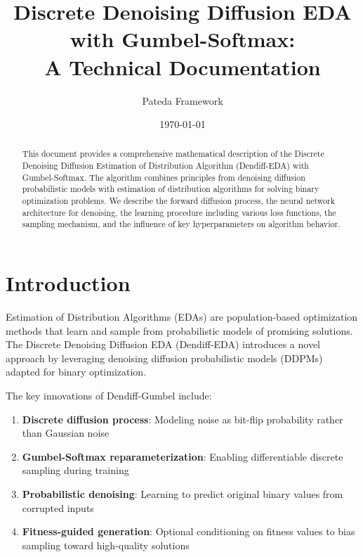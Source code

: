 \documentclass[11pt,a4paper]{article}
\title{Discrete Denoising Diffusion EDA with Gumbel-Softmax:\\
A Technical Documentation}
\author{Pateda Framework}
\date{\today}
\begin{document}
\maketitle

\begin{abstract}
This document provides a comprehensive mathematical description of the Discrete Denoising Diffusion Estimation of Distribution Algorithm (Dendiff-EDA) with Gumbel-Softmax. The algorithm combines principles from denoising diffusion probabilistic models with estimation of distribution algorithms for solving binary optimization problems. We describe the forward diffusion process, the neural network architecture for denoising, the learning procedure including various loss functions, the sampling mechanism, and the influence of key hyperparameters on algorithm behavior.
\end{abstract}

\tableofcontents
\newpage

\section{Introduction}

Estimation of Distribution Algorithms (EDAs) are population-based optimization methods that learn and sample from probabilistic models of promising solutions. The Discrete Denoising Diffusion EDA (Dendiff-EDA) introduces a novel approach by leveraging denoising diffusion probabilistic models (DDPMs) adapted for binary optimization.

The key innovations of Dendiff-Gumbel include:
\begin{enumerate}
    \item \textbf{Discrete diffusion process}: Modeling noise as bit-flip probability rather than Gaussian noise
    \item \textbf{Gumbel-Softmax reparameterization}: Enabling differentiable discrete sampling during training
    \item \textbf{Probabilistic denoising}: Learning to predict original binary values from corrupted inputs
    \item \textbf{Fitness-guided generation}: Optional conditioning on fitness values to bias sampling toward high-quality solutions
\end{enumerate}

\end{document}
